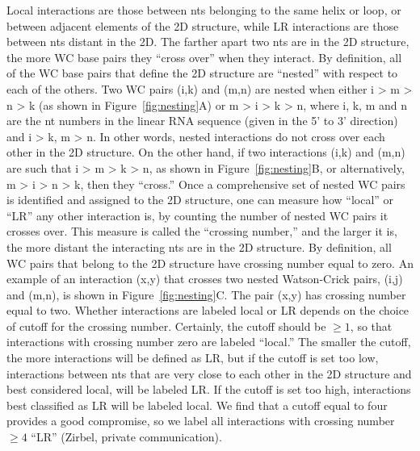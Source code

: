 Local interactions are those between nts belonging to the same helix or loop, or
between adjacent elements of the 2D structure, while LR interactions are those
between nts distant in the 2D\@. The farther apart two nts are in the 2D
structure, the more WC base pairs they ``cross over'' when they interact. By
definition, all of the WC base pairs that define the 2D structure are ``nested''
with respect to each of the others.  Two WC pairs (i,k) and (m,n) are nested
when either i \textgreater{} m \textgreater{} n \textgreater{} k (as shown in
Figure~\ref{fig:nesting}A) or m \textgreater{} i \textgreater{} k \textgreater{} n,
where i, k, m and n are the nt numbers in the linear RNA sequence (given in the
5’ to 3’ direction) and i \textgreater{} k, m \textgreater{} n. In other words,
nested interactions do not cross over each other in the 2D structure. On the
other hand, if two interactions (i,k) and (m,n) are such that i \textgreater{} m
\textgreater{} k \textgreater{} n, as shown in Figure~\ref{fig:nesting}B, or
alternatively, m \textgreater{} i \textgreater{} n \textgreater{} k, then they
``cross.'' Once a comprehensive set of nested WC pairs is identified and
assigned to the 2D structure, one can measure how ``local'' or ``LR'' any other
interaction is, by counting the number of nested WC pairs it crosses over. This
measure is called the “crossing number,” and the larger it is, the more distant
the interacting nts are in the 2D structure.  By definition, all WC pairs that
belong to the 2D structure have crossing number equal to zero. An example of an
interaction (x,y) that crosses two nested Watson-Crick pairs, (i,j) and (m,n),
is shown in Figure~\ref{fig:nesting}C\@. The pair (x,y) has crossing number equal
to two. Whether interactions are labeled local or LR depends on the choice of
cutoff for the crossing number. Certainly, the cutoff should be $\ge 1$, so that
interactions with crossing number zero are labeled ``local.'' The smaller the
cutoff, the more interactions will be defined as LR, but if the cutoff is set
too low, interactions between nts that are very close to each other in the 2D
structure and best considered local, will be labeled LR\@. If the cutoff is set
too high, interactions best classified as LR will be labeled local. We find that
a cutoff equal to four provides a good compromise, so we label all interactions
with crossing number $\ge 4$ ``LR'' (Zirbel, private communication). 

